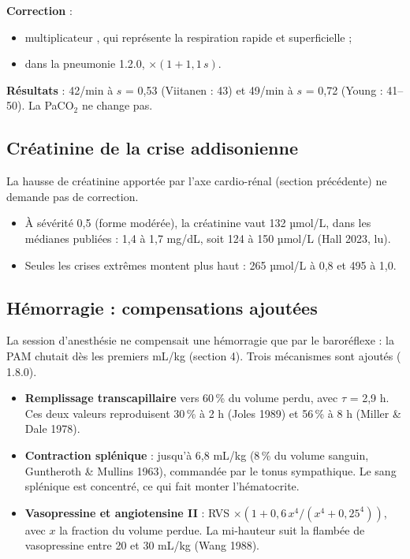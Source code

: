 \documentclass[10pt,a4paper]{article}
\newcommand{\vp}[1]{\path{#1}}
\begin{document}
\textbf{Correction} :
\begin{itemize}
\item multiplicateur \vp{rr_mult}, qui représente la respiration rapide et superficielle ;
\item dans la pneumonie 1.2.0, $\times(1 + 1{,}1\,s)$.
\end{itemize}

\textbf{Résultats} : 42/min à $s$ = 0,53 (Viitanen : 43) et 49/min à $s$ = 0,72 (Young : 41–50). La PaCO$_2$ ne change pas.

\subsection{Créatinine de la crise addisonienne}
La hausse de créatinine apportée par l'axe cardio-rénal (section précédente) ne demande pas de correction.
\begin{itemize}
\item À sévérité 0,5 (forme modérée), la créatinine vaut 132 µmol/L, dans les médianes publiées : 1,4 à 1,7 mg/dL, soit 124 à 150 µmol/L (Hall 2023, lu).
\item Seules les crises extrêmes montent plus haut : 265 µmol/L à 0,8 et 495 à 1,0.
\end{itemize}

\subsection{Hémorragie : compensations ajoutées}
La session d'anesthésie ne compensait une hémorragie que par le baroréflexe : la PAM chutait dès les premiers mL/kg (section 4). Trois mécanismes sont ajoutés (\vp{anesthesia_model.json} 1.8.0).
\begin{itemize}
\item \textbf{Remplissage transcapillaire} vers 60\,\% du volume perdu, avec $\tau$ = 2,9 h. Ces deux valeurs reproduisent 30\,\% à 2 h (Joles 1989) et 56\,\% à 8 h (Miller \& Dale 1978).
\item \textbf{Contraction splénique} : jusqu'à 6,8 mL/kg (8\,\% du volume sanguin, Guntheroth \& Mullins 1963), commandée par le tonus sympathique. Le sang splénique est concentré, ce qui fait monter l'hématocrite.
\item \textbf{Vasopressine et angiotensine II} : RVS $\times(1 + 0{,}6\,x^4/(x^4 + 0{,}25^4))$, avec $x$ la fraction du volume perdue. La mi-hauteur suit la flambée de vasopressine entre 20 et 30 mL/kg (Wang 1988).
\end{itemize}
\end{document}
